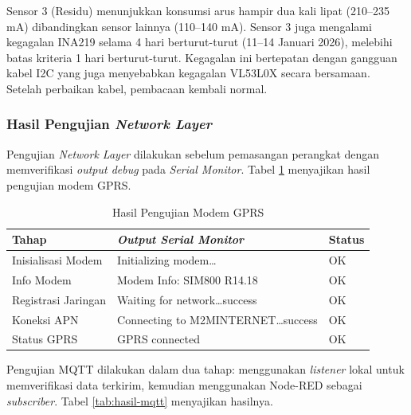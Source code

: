 Sensor 3 (Residu) menunjukkan konsumsi arus hampir dua kali lipat (210--235 mA) dibandingkan sensor lainnya (110--140 mA). Sensor 3 juga mengalami kegagalan INA219 selama 4 hari berturut-turut (11--14 Januari 2026), melebihi batas kriteria 1 hari berturut-turut. Kegagalan ini bertepatan dengan gangguan kabel I2C yang juga menyebabkan kegagalan VL53L0X secara bersamaan. Setelah perbaikan kabel, pembacaan kembali normal.

\subsubsection{Hasil Pengujian \textit{Network Layer}}

Pengujian \textit{Network Layer} dilakukan sebelum pemasangan perangkat dengan memverifikasi \textit{output debug} pada \textit{Serial Monitor}. Tabel \ref{tab:hasil-gprs} menyajikan hasil pengujian modem GPRS.

\begin{table}[H]
  \caption{Hasil Pengujian Modem GPRS}
  \label{tab:hasil-gprs}
  \begin{tabularx}{\textwidth}{| l | X | l |}
    \hline
    \textbf{Tahap} & \textbf{\textit{Output Serial Monitor}} & \textbf{Status} \\
    \hline
    Inisialisasi Modem  & Initializing modem\ldots           & OK \\
    \hline
    Info Modem          & Modem Info: SIM800 R14.18          & OK \\
    \hline
    Registrasi Jaringan & Waiting for network\ldots success  & OK \\
    \hline
    Koneksi APN         & Connecting to M2MINTERNET\ldots success & OK \\
    \hline
    Status GPRS         & GPRS connected                     & OK \\
    \hline
  \end{tabularx}
\end{table}

Pengujian MQTT dilakukan dalam dua tahap: menggunakan \textit{listener} lokal untuk memverifikasi data terkirim, kemudian menggunakan Node-RED sebagai \textit{subscriber}. Tabel \ref{tab:hasil-mqtt} menyajikan hasilnya.


